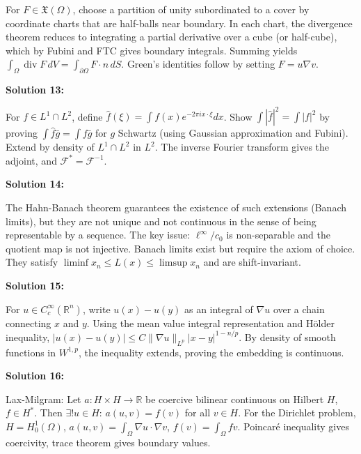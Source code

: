 \documentclass[12pt,a4paper]{exam}
\begin{document}
For $F \in \mathfrak{X}(\Omega)$, choose a partition of unity subordinated to a cover by coordinate charts that are half-balls near boundary. In each chart, the divergence theorem reduces to integrating a partial derivative over a cube (or half-cube), which by Fubini and FTC gives boundary integrals. Summing yields $\int_\Omega \operatorname{div} F \, dV = \int_{\partial\Omega} F \cdot n \, dS$. Green's identities follow by setting $F = u \nabla v$.

\vspace{0.5cm}

\textbf{Solution 13:}

For $f \in L^1 \cap L^2$, define $\widehat{f}(\xi) = \int f(x) e^{-2\pi i x \cdot \xi} dx$. Show $\int |\widehat{f}|^2 = \int |f|^2$ by proving $\int \widehat{f} \bar{g} = \int f \bar{g}$ for $g$ Schwartz (using Gaussian approximation and Fubini). Extend by density of $L^1 \cap L^2$ in $L^2$. The inverse Fourier transform gives the adjoint, and $\mathcal{F}^* = \mathcal{F}^{-1}$.

\vspace{0.5cm}

\textbf{Solution 14:}

The Hahn-Banach theorem guarantees the existence of such extensions (Banach limits), but they are not unique and not continuous in the sense of being representable by a sequence. The key issue: $\ell^\infty / c_0$ is non-separable and the quotient map is not injective. Banach limits exist but require the axiom of choice. They satisfy $\liminf x_n \leq L(x) \leq \limsup x_n$ and are shift-invariant.

\vspace{0.5cm}

\textbf{Solution 15:}

For $u \in C_c^\infty(\mathbb{R}^n)$, write $u(x) - u(y)$ as an integral of $\nabla u$ over a chain connecting $x$ and $y$. Using the mean value integral representation and H\"older inequality, $|u(x) - u(y)| \leq C \|\nabla u\|_{L^p} |x-y|^{1-n/p}$. By density of smooth functions in $W^{1,p}$, the inequality extends, proving the embedding is continuous.

\vspace{0.5cm}

\textbf{Solution 16:}

Lax-Milgram: Let $a: H \times H \to \mathbb{R}$ be coercive bilinear continuous on Hilbert $H$, $f \in H^*$. Then $\exists! u \in H$: $a(u,v) = f(v)$ for all $v \in H$. For the Dirichlet problem, $H = H_0^1(\Omega)$, $a(u,v) = \int_\Omega \nabla u \cdot \nabla v$, $f(v) = \int_\Omega f v$. Poincar\'e inequality gives coercivity, trace theorem gives boundary values.
\end{document}

